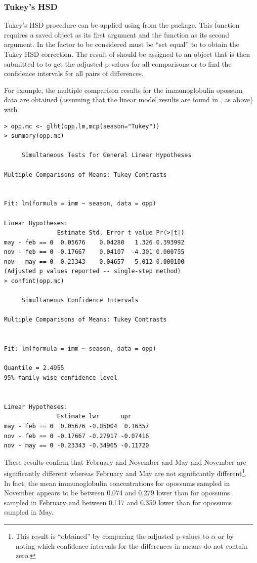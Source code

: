 \documentclass[10pt,openany]{book}\usepackage[]{graphicx}\usepackage[]{color}
\makeatletter
\newenvironment{kframe}{%
 \def\at@end@of@kframe{}%
 \ifinner\ifhmode%
  \def\at@end@of@kframe{\end{minipage}}%
  \begin{minipage}{\columnwidth}%
 \fi\fi%
 \def\FrameCommand##1{\hskip\@totalleftmargin \hskip-\fboxsep
 \colorbox{shadecolor}{##1}\hskip-\fboxsep
     \hskip-\linewidth \hskip-\@totalleftmargin \hskip\columnwidth}%
 \MakeFramed {\advance\hsize-\width
   \@totalleftmargin\z@ \linewidth\hsize
   \@setminipage}}%
 {\par\unskip\endMakeFramed%
 \at@end@of@kframe}
\newenvironment{knitrout}{}{} %
\makeatother
\begin{document}
\subsubsection*{Tukey's HSD}
Tukey's HSD procedure can be applied using  from the  package.  This function requires a saved  object as its first argument and the  function as its second argument.  In  the factor to be considered must be ``set equal'' to  to obtain the Tukey HSD correction.  The result of  should be assigned to an object that is then submitted to  to get the adjusted p-values for all comparisons or  to find the confidence intervals for all pairs of differences.

For example, the multiple comparison results for the immunoglobulin opossum data are obtained (assuming that the linear model results are found in , as above) with

\begin{knitrout}
\color{fgcolor}\begin{kframe}
\begin{verbatim}
> opp.mc <- glht(opp.lm,mcp(season="Tukey"))
> summary(opp.mc)

	 Simultaneous Tests for General Linear Hypotheses

Multiple Comparisons of Means: Tukey Contrasts


Fit: lm(formula = imm ~ season, data = opp)

Linear Hypotheses:
               Estimate Std. Error t value Pr(>|t|)
may - feb == 0  0.05676    0.04280   1.326 0.393992
nov - feb == 0 -0.17667    0.04107  -4.301 0.000755
nov - may == 0 -0.23343    0.04657  -5.012 0.000100
(Adjusted p values reported -- single-step method)
> confint(opp.mc)

	 Simultaneous Confidence Intervals

Multiple Comparisons of Means: Tukey Contrasts


Fit: lm(formula = imm ~ season, data = opp)

Quantile = 2.4955
95% family-wise confidence level
 

Linear Hypotheses:
               Estimate lwr      upr     
may - feb == 0  0.05676 -0.05004  0.16357
nov - feb == 0 -0.17667 -0.27917 -0.07416
nov - may == 0 -0.23343 -0.34965 -0.11720
\end{verbatim}
\end{kframe}
\end{knitrout}
These results confirm that February and November and May and November are significantly different whereas February and May are not significantly different\footnote{This result is ``obtained'' by comparing the adjusted p-values to $\alpha$ or by noting which confidence intervals for the differences in means do not contain zero.}.  In fact, the mean immunoglobulin concentrations for opossums sampled in November appears to be between 0.074 and 0.279 lower than for opossums sampled in February and between 0.117 and 0.350 lower than for opossums sampled in May.
\end{document}
